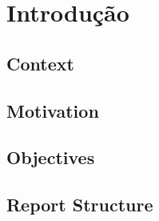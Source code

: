 \chapter{Introdução} \label{chap:intro}

\section{Context}

\section{Motivation}

\section{Objectives}

\section{Report Structure}

